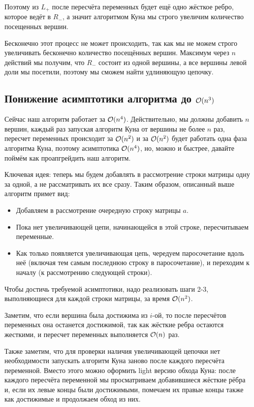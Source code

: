 \documentclass[a4paper, 12pt]{article}
\begin{document}
Поэтому из $L_+$ после пересчёта переменных будет ещё одно жёсткое ребро, которое
ведёт в $R_-$, а значит алгоритмом Куна мы строго увеличим количество посещенных
вершин.

Бесконечно этот процесс не может происходить, так как мы не можем строго увеличивать
бесконечно количество посещённых вершин. Максимум через $n$ действий мы получим,
что $R_-$ состоит из одной вершины, а все вершины левой доли мы посетили, поэтому
мы сможем найти удлиняющую цепочку.

\subsection{Понижение асимптотики алгоритма до $\mathcal{O}(n^3)$}

Сейчас наш алгоритм работает за $\mathcal{O}(n^4)$. Действительно, мы должны добавить $n$
вершин, каждый раз запуская алгоритм Куна от вершины не более $n$ раз, пересчет
переменных происходит за $\mathcal{O}(n^2)$ и за $\mathcal{O}(n^2)$ будет работать одна фаза алгоритма
Куна, поэтому асимптотика $\mathcal{O}(n^4)$, но, можно и быстрее, давайте поймём как
проапгрейдить наш алгоритм. 

Ключевая идея: теперь мы будем добавлять в рассмотрение строки матрицы одну за 
одной, а не рассматривать их все сразу. Таким образом, описанный выше алгоритм примет вид:

\begin{itemize}
  \item Добавляем в рассмотрение очередную строку матрицы $a$.
  \item Пока нет увеличивающей цепи, начинающейся в этой строке, пересчитываем переменные.
  \item Как только появляется увеличивающая цепь, чередуем паросочетание вдоль неё 
  (включая тем самым последнюю строку в паросочетание), и переходим к началу 
  (к рассмотрению следующей строки).
\end{itemize}

Чтобы достичь требуемой асимптотики, надо реализовать шаги 2-3, выполняющиеся 
для каждой строки матрицы, за время $\mathcal{O}(n^2)$.

Заметим, что если вершина была достижима из $i$-ой, то после пересчётов переменных она
останется достижимой, так как жёсткие ребра остаются жесткими, и пересчет
переменных выполняется $\mathcal{O}(n)$ раз.

Также заметим, что 
для проверки наличия увеличивающей цепочки нет необходимости запускать алгоритм
Куна заново после каждого пересчёта переменной. 
Вместо этого можно оформить light версию обхода Куна: после каждого 
пересчёта переменной мы просматриваем добавившиеся жёсткие рёбра и, если их 
левые концы были достижимыми, помечаем их правые концы также как достижимые и 
продолжаем обход из них.
\end{document}
